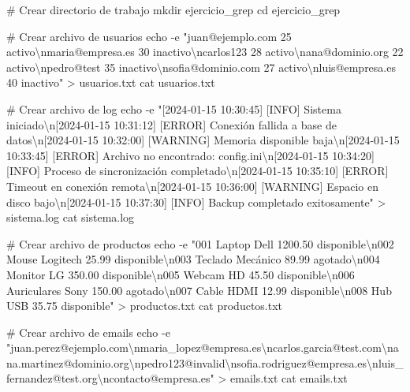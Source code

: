 \documentclass[
  spanish,
  12pt,
  letterpaper,
  DIV=11,
  numbers=noendperiod]{scrreprt}
\newenvironment{Shaded}{\begin{snugshade}}{\end{snugshade}}
\newcommand{\AttributeTok}[1]{\textcolor[rgb]{0.40,0.45,0.13}{#1}}
\newcommand{\BuiltInTok}[1]{\textcolor[rgb]{0.00,0.23,0.31}{#1}}
\newcommand{\CommentTok}[1]{\textcolor[rgb]{0.37,0.37,0.37}{#1}}
\newcommand{\FunctionTok}[1]{\textcolor[rgb]{0.28,0.35,0.67}{#1}}
\newcommand{\NormalTok}[1]{\textcolor[rgb]{0.00,0.23,0.31}{#1}}
\newcommand{\OperatorTok}[1]{\textcolor[rgb]{0.37,0.37,0.37}{#1}}
\newcommand{\StringTok}[1]{\textcolor[rgb]{0.13,0.47,0.30}{#1}}
\begin{document}
\begin{Shaded}
\begin{Highlighting}[]
\CommentTok{\# Crear directorio de trabajo}
\FunctionTok{mkdir}\NormalTok{ ejercicio\_grep}
\BuiltInTok{cd}\NormalTok{ ejercicio\_grep}

\CommentTok{\# Crear archivo de usuarios}
\BuiltInTok{echo} \AttributeTok{{-}e} \StringTok{"juan@ejemplo.com 25 activo\textbackslash{}nmaria@empresa.es 30 inactivo\textbackslash{}ncarlos123 28 activo\textbackslash{}nana@dominio.org 22 activo\textbackslash{}npedro@test 35 inactivo\textbackslash{}nsofia@dominio.com 27 activo\textbackslash{}nluis@empresa.es 40 inactivo"} \OperatorTok{\textgreater{}}\NormalTok{ usuarios.txt}
\FunctionTok{cat}\NormalTok{ usuarios.txt}

\CommentTok{\# Crear archivo de log}
\BuiltInTok{echo} \AttributeTok{{-}e} \StringTok{"[2024{-}01{-}15 10:30:45] [INFO] Sistema iniciado\textbackslash{}n[2024{-}01{-}15 10:31:12] [ERROR] Conexión fallida a base de datos\textbackslash{}n[2024{-}01{-}15 10:32:00] [WARNING] Memoria disponible baja\textbackslash{}n[2024{-}01{-}15 10:33:45] [ERROR] Archivo no encontrado: config.ini\textbackslash{}n[2024{-}01{-}15 10:34:20] [INFO] Proceso de sincronización completado\textbackslash{}n[2024{-}01{-}15 10:35:10] [ERROR] Timeout en conexión remota\textbackslash{}n[2024{-}01{-}15 10:36:00] [WARNING] Espacio en disco bajo\textbackslash{}n[2024{-}01{-}15 10:37:30] [INFO] Backup completado exitosamente"} \OperatorTok{\textgreater{}}\NormalTok{ sistema.log}
\FunctionTok{cat}\NormalTok{ sistema.log}

\CommentTok{\# Crear archivo de productos}
\BuiltInTok{echo} \AttributeTok{{-}e} \StringTok{"001 Laptop Dell 1200.50 disponible\textbackslash{}n002 Mouse Logitech 25.99 disponible\textbackslash{}n003 Teclado Mecánico 89.99 agotado\textbackslash{}n004 Monitor LG 350.00 disponible\textbackslash{}n005 Webcam HD 45.50 disponible\textbackslash{}n006 Auriculares Sony 150.00 agotado\textbackslash{}n007 Cable HDMI 12.99 disponible\textbackslash{}n008 Hub USB 35.75 disponible"} \OperatorTok{\textgreater{}}\NormalTok{ productos.txt}
\FunctionTok{cat}\NormalTok{ productos.txt}

\CommentTok{\# Crear archivo de emails}
\BuiltInTok{echo} \AttributeTok{{-}e} \StringTok{"juan.perez@ejemplo.com\textbackslash{}nmaria\_lopez@empresa.es\textbackslash{}ncarlos.garcia@test.com\textbackslash{}nana.martinez@dominio.org\textbackslash{}npedro123@invalid\textbackslash{}nsofia.rodriguez@empresa.es\textbackslash{}nluis\_fernandez@test.org\textbackslash{}ncontacto@empresa.es"} \OperatorTok{\textgreater{}}\NormalTok{ emails.txt}
\FunctionTok{cat}\NormalTok{ emails.txt}


\end{Highlighting}
\end{Shaded}
\end{document}

